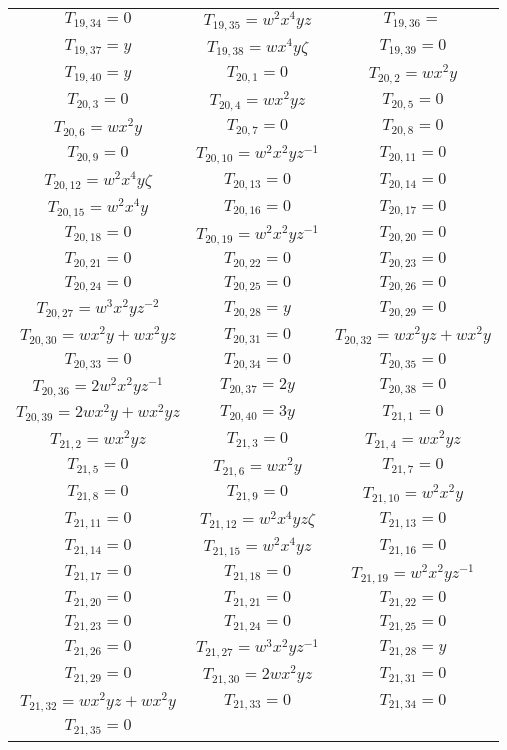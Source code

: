\documentclass[12pt]{memoireuqam1.3}
\begin{document}
\begin{longtable}{|c|c|c|}
$T_{19,34}= 0$&
$T_{19,35}= w^2x^4yz$&
$T_{19,36}= $\\
$T_{19,37}= y$&
$T_{19,38}= wx^4y\zeta$&
$T_{19,39}= 0$\\
$T_{19,40}= y$&
$T_{20,1}= 0$&
$T_{20,2}= wx^2y$\\
$T_{20,3}= 0$&
$T_{20,4}= wx^2yz$&
$T_{20,5}= 0$\\
$T_{20,6}= wx^2y$&
$T_{20,7}= 0$&
$T_{20,8}= 0$\\
$T_{20,9}= 0$&
$T_{20,10}= w^2x^2yz^{-1}$&
$T_{20,11}= 0$\\
$T_{20,12}= w^2x^4y\zeta$&
$T_{20,13}= 0$&
$T_{20,14}= 0$\\
$T_{20,15}= w^2x^4y$&
$T_{20,16}= 0$&
$T_{20,17}= 0$\\
$T_{20,18}= 0$&
$T_{20,19}= w^2x^2yz^{-1}$&
$T_{20,20}= 0$\\
$T_{20,21}= 0$&
$T_{20,22}= 0$&
$T_{20,23}= 0$\\
$T_{20,24}= 0$&
$T_{20,25}= 0$&
$T_{20,26}= 0$\\
$T_{20,27}= w^3x^2yz^{-2}$&
$T_{20,28}= y$&
$T_{20,29}= 0$\\
$T_{20,30}= wx^2y+wx^2yz$&
$T_{20,31}= 0$&
$T_{20,32}= wx^2yz+wx^2y$\\
$T_{20,33}= 0$&
$T_{20,34}= 0$&
$T_{20,35}= 0$\\
$T_{20,36}= 2w^2x^2yz^{-1}$&
$T_{20,37}= 2y$&
$T_{20,38}= 0$\\
$T_{20,39}= 2wx^2y+wx^2yz$&
$T_{20,40}= 3y$&
$T_{21,1}= 0$\\
$T_{21,2}= wx^2yz$&
$T_{21,3}= 0$&
$T_{21,4}= wx^2yz$\\
$T_{21,5}= 0$&
$T_{21,6}= wx^2y$&
$T_{21,7}= 0$\\
$T_{21,8}= 0$&
$T_{21,9}= 0$&
$T_{21,10}= w^2x^2y$\\
$T_{21,11}= 0$&
$T_{21,12}= w^2x^4yz\zeta$&
$T_{21,13}= 0$\\
$T_{21,14}= 0$&
$T_{21,15}= w^2x^4yz$&
$T_{21,16}= 0$\\
$T_{21,17}= 0$&
$T_{21,18}= 0$&
$T_{21,19}= w^2x^2yz^{-1}$\\
$T_{21,20}= 0$&
$T_{21,21}= 0$&
$T_{21,22}= 0$\\
$T_{21,23}= 0$&
$T_{21,24}= 0$&
$T_{21,25}= 0$\\
$T_{21,26}= 0$&
$T_{21,27}= w^3x^2yz^{-1}$&
$T_{21,28}= y$\\
$T_{21,29}= 0$&
$T_{21,30}= 2wx^2yz$&
$T_{21,31}= 0$\\
$T_{21,32}= wx^2yz+wx^2y$&
$T_{21,33}= 0$&
$T_{21,34}= 0$\\
$T_{21,35}= 0$&

\end{longtable}
\end{document}
